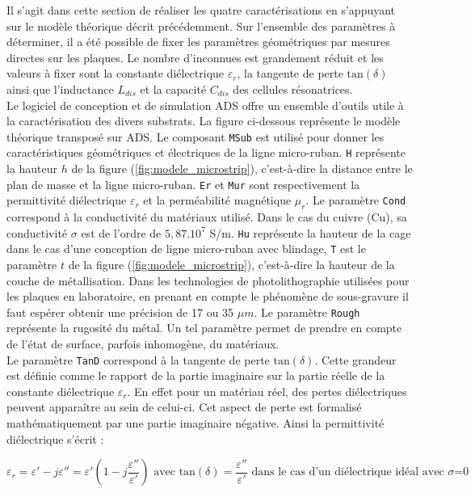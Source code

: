 \documentclass[french]{article}
\begin{document}
Il s'agit dans cette section de réaliser les quatre caractérisations en s'appuyant sur le modèle théorique décrit précédemment. Sur l'ensemble des paramètres à déterminer, il a été possible de fixer les paramètres géométriques par mesures directes sur les plaques. Le nombre d'inconnues est grandement réduit et les valeurs à fixer sont la constante diélectrique $\varepsilon_r$, la tangente de perte $\mbox{tan}(\delta)$ ainsi que l'inductance $L_{dis}$ et la capacité $C_{dis}$ des cellules résonatrices.\\
Le logiciel de conception et de simulation ADS offre un ensemble d'outils utile à la caractérisation des divers substrats. La figure ci-dessous représente le modèle théorique transposé sur ADS. Le composant \texttt{MSub} est utilisé pour donner les caractéristiques géométriques et électriques de la ligne micro-ruban. \texttt{H} représente la hauteur $h$ de la figure (\ref{fig:modele_microstrip}), c'est-à-dire la distance entre le plan de masse et la ligne micro-ruban. \texttt{Er} et \texttt{Mur} sont respectivement la permittivité diélectrique $\varepsilon_r$ et la perméabilité magnétique $\mu_r$. Le paramètre \texttt{Cond} correspond à la conductivité du matériaux utilisé. Dans le cas du cuivre (Cu), sa conductivité $\sigma$ est de l'ordre de $5,87.10^{7}$ S/m. \texttt{Hu} représente la hauteur de la cage dans le cas d'une conception de ligne micro-ruban avec blindage, \texttt{T} est le paramètre $t$ de la figure (\ref{fig:modele_microstrip}), c'est-à-dire la hauteur de la couche de métallisation. Dans les technologies de photolithographie utilisées pour les plaques en laboratoire, en prenant en compte le phénomène de sous-gravure il faut espérer obtenir une précision de 17 ou 35 $\mu m$. Le paramètre \texttt{Rough} représente la rugosité du métal. Un tel paramètre permet de prendre en compte de l'état de surface, parfois inhomogène, du matériaux.\\
Le paramètre \texttt{TanD} correspond à la tangente de perte $\mbox{tan}(\delta)$. Cette grandeur est définie comme le rapport de la partie imaginaire sur la partie réelle de la constante diélectrique $\varepsilon_r$. En effet pour un matériau réel, des pertes diélectriques peuvent apparaître au sein de celui-ci. Cet aspect de perte est formalisé mathématiquement par une partie imaginaire négative. Ainsi la permittivité diélectrique s'écrit :

\begin{equation}
	\varepsilon_r=\varepsilon'-j\varepsilon''=\varepsilon'(1-j\frac{\varepsilon''}{\varepsilon'}) \mbox{ avec } \mbox{tan}(\delta)=\frac{\varepsilon''}{\varepsilon'} \mbox{ dans le cas d'un diélectrique idéal avec $\sigma$=0}
\end{equation}
\end{document}
